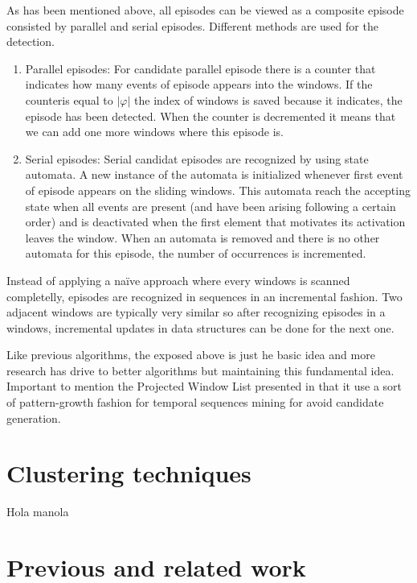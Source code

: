 As has been mentioned above, all episodes can be viewed as a composite episode
consisted by parallel and serial episodes. Different methods are used for the
detection. 
\begin{enumerate}[label=\roman*)]
  \item Parallel episodes: For candidate parallel episode there is a counter
    that indicates how many events of episode appears into the windows. If the
    counteris equal to $|\varphi|$ the index of windows is saved because it
    indicates, the episode has been detected. When the counter is decremented
    it means that we can add one more windows where this episode is.
  \item Serial episodes: Serial candidat episodes are recognized by using state
    automata. A new instance of the automata is initialized whenever first event
    of episode appears on the sliding windows. This automata reach the accepting
    state when all events are present (and have been arising following a certain
    order) and is deactivated when the first element
    that motivates its activation leaves the window. When an automata is removed
    and there is no other automata for this episode, the number of occurrences
    is incremented.
\end{enumerate}

Instead of applying a naïve approach where every windows is scanned
completelly, episodes are recognized in sequences in an incremental fashion. 
Two adjacent windows are typically very similar so after
recognizing episodes in a windows, incremental updates in data structures can be
done for the next one.

Like previous algorithms, the exposed above is just he basic idea and more
research has drive to better algorithms but maintaining this fundamental idea.
Important to mention the Projected Window List presented in
\cite{huang2004prowl} that it use a sort of pattern-growth fashion for temporal
sequences mining for avoid candidate generation.

\section{Clustering techniques}

Hola manola

\section{Previous and related work}\label{related_work}

